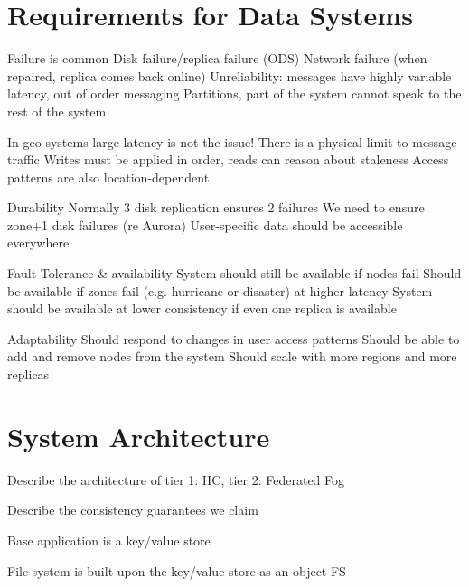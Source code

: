 \section{Requirements for Data Systems}

Failure is common
    Disk failure/replica failure (ODS)
    Network failure (when repaired, replica comes back online)
    Unreliability: messages have highly variable latency, out of order messaging
    Partitions, part of the system cannot speak to the rest of the system

In geo-systems large latency is not the issue!
    There is a physical limit to message traffic
    Writes must be applied in order, reads can reason about staleness
    Access patterns are also location-dependent

Durability
    Normally 3 disk replication ensures 2 failures
    We need to ensure zone+1 disk failures (re Aurora)
    User-specific data should be accessible everywhere

Fault-Tolerance \& availability
    System should still be available if nodes fail
    Should be available if zones fail (e.g. hurricane or disaster) at higher latency
    System should be available at lower consistency if even one replica is available

Adaptability
    Should respond to changes in user access patterns
    Should be able to add and remove nodes from the system
    Should scale with more regions and more replicas

\section{System Architecture}

Describe the architecture of tier 1: HC, tier 2: Federated Fog

Describe the consistency guarantees we claim

Base application is a key/value store

File-system is built upon the key/value store as an object FS

